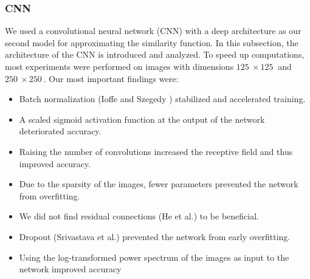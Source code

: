 \documentclass[10pt,conference,compsocconf]{IEEEtran}
\begin{document}

\subsubsection{CNN} %
We used a convolutional neural network (CNN) with a deep architecture as our second model for approximating the similarity function. In this subsection, the architecture of the CNN is introduced and analyzed.
To speed up computations, most experiments were performed on images with dimensions $\SI{125}{}\times\SI{125}{}$ and $\SI{250}{}\times\SI{250}{}$. Our most important findings were:

\begin{itemize}
\item Batch normalization (Ioffe and Szegedy \cite{BatchNorm}) stabilized and accelerated training.
\item A scaled sigmoid activation function at the output of the network deteriorated accuracy.
\item Raising the number of convolutions increased the receptive field and thus improved accuracy.
\item Due to the sparsity of the images, fewer parameters prevented the network from overfitting.
\item We did not find residual connections (He et al.\@ \cite{ResNet}) to be beneficial.
\item Dropout (Srivastava et al.\@ \cite{Dropout}) prevented the network from early overfitting.
\item Using the log-transformed power spectrum of the images as input to the network improved accuracy
\end{itemize}
\end{document}
